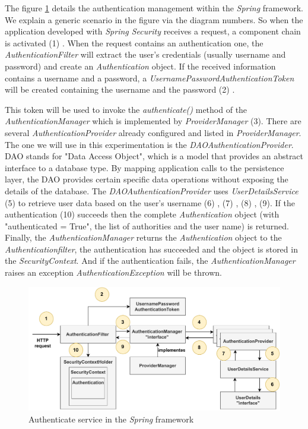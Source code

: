 The figure \ref{fig:ArchitectureAuthenticationSpring} details the authentication management within the \textit{Spring} framework. We explain a generic scenario in the figure via the diagram numbers. So when the application developed with \textit{Spring Security} receives a request, a component chain is activated (1) . When the request contains an authentication one, the \textit{AuthenticationFilter} will extract the user's credentials (usually username and password) and create an \textit{Authentication} object. If the received information contains a username and a password, a \textit{UsernamePasswordAuthenticationToken} will be created containing the username and the password (2) . 

This token will be used to invoke the \textit{authenticate()} method of the \textit{AuthenticationManager} which is implemented by \textit{ProviderManager} (3). There are several \textit{AuthenticationProvider} already configured and listed in \textit{ProviderManager}. The one we will use in this experimentation is the \textit{DAOAuthenticationProvider}. DAO stands for "Data Access Object", which is a model that provides an abstract interface to a database type. By mapping application calls to the persistence layer, the DAO provides certain specific data operations without exposing the details of the database. The \textit{DAOAuthenticationProvider} uses \textit{UserDetailsService} (5) to retrieve user data based on the user's username (6) , (7) , (8) , (9). If the authentication (10) succeeds then the complete \textit{Authentication} object (with "authenticated = True", the list of authorities and the user name) is returned. Finally, the \textit{AuthenticationManager} returns the \textit{Authentication} object to the \textit{Authenticationfilter}, the authentication has succeeded and the object is stored in the \textit{SecurityContext}.
And if the authentication fails,  the \textit{AuthenticationManager} raises an exception \textit{AuthenticationException} will be thrown. 

\begin{figure}[!h]
    \centering
    \includegraphics[width=1.0 \columnwidth]{figures/AuthenticateSpringProcess.pdf}
    \caption{Authenticate service in the \textit{Spring} framework}
    \label{fig:ArchitectureAuthenticationSpring}
\end{figure}


